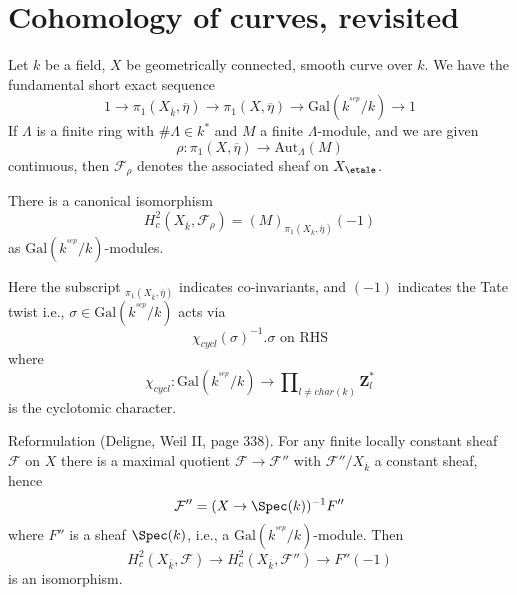 \section{Cohomology of curves, revisited}
\label{section-cohomology-curves-revisited}

\noindent
Let $k$ be a field, $X$ be geometrically connected, smooth curve over $k$.
We have the fundamental short exact sequence
$$
1 \to
\pi_1(X_{\overline{k}}, \overline \eta) \to
\pi_1(X, \overline\eta) \to
\text{Gal}(k^{^{sep}}/k) \to 1
$$
If $\Lambda$ is a finite ring with $\#\Lambda\in k^*$ and $M$ a finite
$\Lambda$-module, and we are given
$$
\rho : \pi_1(X, \overline\eta) \to \text{Aut}_{\Lambda}(M)
$$
continuous, then $\mathcal{F}_\rho$ denotes the associated sheaf on
$X_\etale$.

\begin{lemma}
\label{lemma-identify-h2c}
There is a canonical isomorphism
$$
H_c^2(X_{\overline{k}}, \mathcal{F}_\rho)=(M)_{\pi_1(X_{\overline{k}},
\overline\eta)}(-1)
$$
as $\text{Gal}(k^{^{sep}}/k)$-modules.
\end{lemma}

\noindent
Here the subscript ${}_{\pi_1(X_{\overline{k}}, \overline\eta)}$
indicates co-invariants, and $(-1)$ indicates the Tate twist i.e.,
$\sigma\in \text{Gal}(k^{^{sep}}/k)$ acts via
$$
\chi_{cycl}(\sigma)^{-1}.\sigma\text{ on RHS}
$$
where
$$
\chi_{cycl} :
\text{Gal}(k^{^{sep}}/k)
\to
\prod\nolimits_{l\neq char(k)}\mathbf{Z}_l^*
$$
is the cyclotomic character.

\medskip\noindent
Reformulation (Deligne, Weil II, page 338). For any finite locally
constant sheaf $\mathcal{F}$ on $X$ there is a maximal quotient $\mathcal{F}\to
\mathcal{F}''$ with $\mathcal{F}''/X_{\overline{k}}$ a constant sheaf, hence
$$
\mathcal{F}'' = (X\to \Spec(k))^{-1}F''
$$
where $F''$ is a sheaf $\Spec(k)$, i.e., a
$\text{Gal}(k^{^{sep}}/k)$-module. Then
$$
H_c^2(X_{\overline{k}}, \mathcal{F})\to H_c^2(X_{\overline{k}},
\mathcal{F}'')\to F''(-1)
$$
is an isomorphism.


